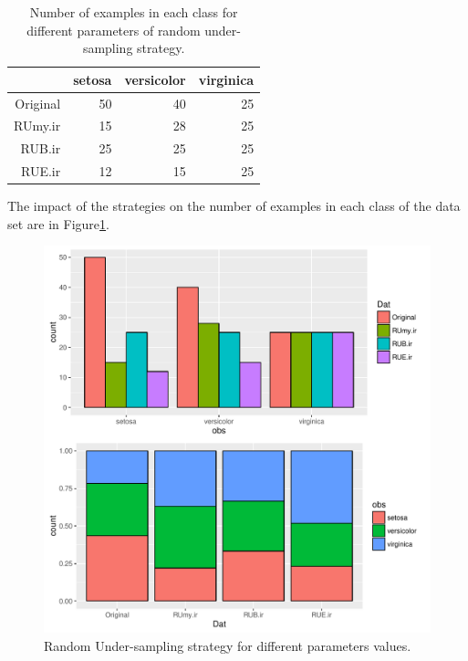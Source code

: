 \documentclass[10pt,a4paper]{article}\usepackage[]{graphicx}\usepackage[]{color}
\makeatletter
\def\maxwidth{ %
  \ifdim\Gin@nat@width>\linewidth
    \linewidth
  \else
    \Gin@nat@width
  \fi
}
\newenvironment{knitrout}{}{} %
\makeatother
\begin{document}
\begin{table}[ht]
\centering
\begin{tabular}{rrrr}
  \hline
 & setosa & versicolor & virginica \\ 
  \hline
Original &  50 &  40 &  25 \\ 
  RUmy.ir &  15 &  28 &  25 \\ 
  RUB.ir &  25 &  25 &  25 \\ 
  RUE.ir &  12 &  15 &  25 \\ 
   \hline
\end{tabular}
\caption{Number of examples in each class for different parameters of random under-sampling strategy.} 
\label{tab:RU_tab}
\end{table}


The impact of the strategies on the number of examples in each class of the data set are in Figure\ref{fig:Iris_RU2}.



\begin{knitrout}\footnotesize
{}\color{fgcolor}\begin{figure}

{\centering \includegraphics[width=\maxwidth]{figures/UBL-Iris_RU2-1} 

}

\caption[Random Under-sampling strategy for different parameters values]{Random Under-sampling strategy for different parameters values.}\label{fig:Iris_RU2}
\end{figure}


\end{knitrout}
\end{document}
